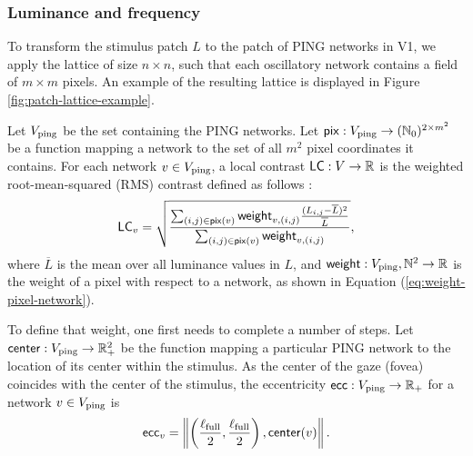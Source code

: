 \subsubsection{Luminance and frequency}

To transform the stimulus patch $L$ to the patch of PING networks in V1, we apply the lattice of size $n \times n$, such that each oscillatory network contains a field of $m \times m$ pixels. An example of the resulting lattice is displayed in Figure \ref{fig:patch-lattice-example}.


Let $V_{\mathrm{ping}}$ be the set containing the PING networks. Let $\mathsf{pix}: V_{\mathrm{ping}} \to (\mathbb{N}_0)^{2 \times m^2}$ be a function mapping a network to the set of all $m^2$ pixel coordinates it contains.
For each network $v \in V_{\mathrm{ping}}$, a local contrast $\mathsf{LC}: V \to \mathbb{R}$ is the weighted root-mean-squared (RMS) contrast defined as follows \cite{Frazor2006}:
\begin{equation}
    \mathsf{LC}_v = \sqrt{
        \frac{
            \sum_{(i, j) \in \mathsf{pix}(v)} \mathsf{weight}_{v, (i, j)} \frac{(L_{i, j} - \overline{L})^2}{\overline{L}}
        }{
            \sum_{(i, j) \in \mathsf{pix}(v)} \mathsf{weight}_{v, (i, j)}
        }
    },
\end{equation}
where $\overline{L}$ is the mean over all luminance values in $L$, and $\mathsf{weight}: V_{\mathrm{ping}}, \mathbb{N}^2 \to \mathbb{R}$ is the weight of a pixel with respect to a network, as shown in Equation (\ref{eq:weight-pixel-network}). 

To define that weight, one first needs to complete a number of steps.
Let $\mathsf{center} : V_{\mathrm{ping}} \to \mathbb{R}_+^2$ be the function mapping a particular PING network to the  location of its center within the stimulus. As the center of the gaze (fovea) coincides with the center of the stimulus, the eccentricity $\mathsf{ecc}: V_{\mathrm{ping}} \to \mathbb{R}_+$ for a network $v \in V_{\mathrm{ping}}$ is
\begin{equation}
    \mathsf{ecc}_{v} = \left\| \left( \frac{\ell_{\mathrm{full}}}{2}, \frac{\ell_{\mathrm{full}}}{2} \right), \mathsf{center}(v) \right\|.
\end{equation}

